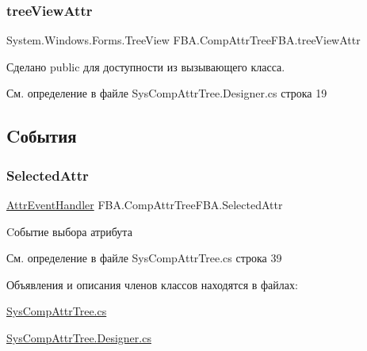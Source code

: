 \subsubsection{\texorpdfstring{tree\+View\+Attr}{treeViewAttr}}
{\footnotesize\ttfamily System.\+Windows.\+Forms.\+Tree\+View F\+B\+A.\+Comp\+Attr\+Tree\+F\+B\+A.\+tree\+View\+Attr}



Сделано public для доступности из вызывающего класса. 



См. определение в файле Sys\+Comp\+Attr\+Tree.\+Designer.\+cs строка 19



\subsection{Cобытия}
\mbox{\label{class_f_b_a_1_1_comp_attr_tree_f_b_a_a01dfd1e2b5fc3689fef9203fc513c2c0}} 
\subsubsection{\texorpdfstring{Selected\+Attr}{SelectedAttr}}
{\footnotesize\ttfamily \mbox{\hyperlink{namespace_f_b_a_a0df7965ddd0519f1d83cbf05f2886d95}{Attr\+Event\+Handler}} F\+B\+A.\+Comp\+Attr\+Tree\+F\+B\+A.\+Selected\+Attr}



Cобытие выбора атрибута 



См. определение в файле Sys\+Comp\+Attr\+Tree.\+cs строка 39



Объявления и описания членов классов находятся в файлах\+:\begin{DoxyCompactItemize}
\item 
\mbox{\hyperlink{_sys_comp_attr_tree_8cs}{Sys\+Comp\+Attr\+Tree.\+cs}}\item 
\mbox{\hyperlink{_sys_comp_attr_tree_8_designer_8cs}{Sys\+Comp\+Attr\+Tree.\+Designer.\+cs}}\end{DoxyCompactItemize}
